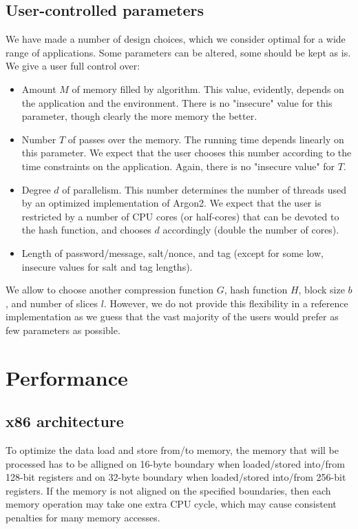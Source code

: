 \documentclass[a4paper]{article}
\begin{document}
\subsection{User-controlled parameters}

We have made a number of design choices, which we consider optimal for a wide range of applications. Some parameters can be altered, some should be kept as is. We give a user full control over:
\begin{itemize}
  \item Amount $M$ of memory filled by algorithm. This value, evidently, depends on the application and the environment. There is no "insecure" value for this parameter, though clearly the more memory the better.
  \item Number $T$ of passes over the memory. The running  time depends linearly on this parameter. We expect that the user chooses this number according to the time constraints on the application. Again, there is no "insecure value" for $T$.
  \item Degree $d$ of parallelism. This number determines the number of threads used by an optimized implementation of \textsf{Argon2}. We expect that the user is restricted by a number of CPU cores (or half-cores) that can be devoted to the hash function, and chooses $d$ accordingly (double the number of cores).
  \item Length of password/message, salt/nonce, and tag (except for some low, insecure values for salt and tag lengths).
\end{itemize}

We allow to choose another compression function $G$, hash function $H$, block size $b$, and number of slices $l$. However, we do not provide this flexibility in a reference implementation as we guess that
the vast majority of the users would prefer as few parameters as possible.



\section{Performance}

\subsection{x86 architecture}
To optimize the data load and store from/to memory, the memory that will be processed has to be alligned on 16-byte boundary when loaded/stored into/from 128-bit registers and on 32-byte boundary when loaded/stored into/from 256-bit registers. If the memory is not aligned on the specified boundaries, then each memory operation may take one extra CPU cycle, which may cause consistent penalties for many memory accesses.
\end{document}
